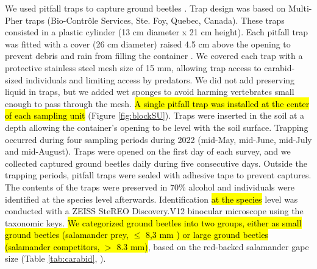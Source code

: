 We used pitfall traps to capture ground beetles \citep{baarsCatchesPitfallTraps1979,spenceSamplingCarabidAssemblages1994a,loveiEcologyBehaviorGround1996,kotzeFortyYearsCarabid2011a,knappEffectPitfallTrap2012}. 
Trap design was based on Multi-Pher traps (Bio-Contrôle Services, Ste. Foy, Quebec, Canada). 
These traps consisted in a plastic cylinder (13 cm diameter x 21 cm height). 
Each pitfall trap was fitted with a cover (26 cm diameter) raised 4.5 cm above the opening to prevent debris and rain from filling the container \citep{Jobin1988MultiPherinsect,Moore2004Effectstwo,bouchardBeetleCommunityResponse2016b}. 
We covered each trap with a protective stainless steel mesh size of 15 mm, allowing trap access to carabid-sized individuals and limiting access by predators.  
We did not add preserving liquid in traps, but we added wet sponges to avoid harming vertebrates small enough to pass through the mesh. 
\hl{A single pitfall trap was installed at the center of each sampling unit} (Figure \ref{fig:blockSU}). 
Traps were inserted in the soil at a depth allowing the container’s opening to be level with the soil surface. 
Trapping occurred during four sampling periods during 2022 (mid-May, mid-June, mid-July and mid-August). 
Traps were opened on the first day of each survey, and we collected captured ground beetles daily during five consecutive days. 
Outside the trapping periods, pitfall traps were sealed with adhesive tape to prevent captures. 
The contents of the traps were preserved in 70\% alcohol and individuals were identified at the species level afterwards. 
Identification \hl{at the species} level was conducted with a ZEISS SteREO Discovery.V12 binocular microscope using the \cite{larochelleManuelIdentificationCarabidae1976} taxonomic keys. 
\hl{We categorized ground beetles into two groups, either as small ground beetles (salamander prey, $\leq$ 8,3 mm ) or large ground beetles (salamander competitors, $>$ 8.3 mm)}, based on the red-backed salamander gape size (Table \ref{tab:carabid}, \citealp{jaegerFoodLimitedResource1972,magliaModulationPreycaptureBehavior1995,magliaOntogenyFeedingEcology1996}).

